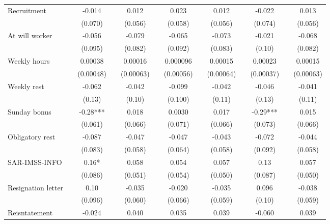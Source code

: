 \begin{tabular}{lcccccccccccc}
Recruitment &       & -0.014 &       & 0.012 &       & 0.023 &       & 0.012 &       & -0.022 &       & 0.013 \\
      &       & (0.070) &       & (0.056) &       & (0.058) &       & (0.056) &       & (0.074) &       & (0.056) \\
At will worker &       & -0.056 &       & -0.079 &       & -0.065 &       & -0.073 &       & -0.021 &       & -0.068 \\
      &       & (0.095) &       & (0.082) &       & (0.092) &       & (0.083) &       & (0.10) &       & (0.082) \\
Weekly hours &       & 0.00038 &       & 0.00016 &       & 0.000096 &       & 0.00015 &       & 0.00023 &       & 0.00015 \\
      &       & (0.00048) &       & (0.00063) &       & (0.00056) &       & (0.00064) &       & (0.00037) &       & (0.00063) \\
Weekly rest &       & -0.062 &       & -0.042 &       & -0.099 &       & -0.042 &       & -0.046 &       & -0.041 \\
      &       & (0.13) &       & (0.10) &       & (0.100) &       & (0.11) &       & (0.13) &       & (0.11) \\
Sunday bonus &       & -0.28*** &       & 0.018 &       & 0.0030 &       & 0.017 &       & -0.29*** &       & 0.015 \\
      &       & (0.061) &       & (0.066) &       & (0.071) &       & (0.066) &       & (0.073) &       & (0.066) \\
Obligatory rest &       & -0.087 &       & -0.047 &       & -0.047 &       & -0.043 &       & -0.072 &       & -0.044 \\
      &       & (0.083) &       & (0.058) &       & (0.064) &       & (0.058) &       & (0.092) &       & (0.058) \\
SAR-IMSS-INFO &       & 0.16* &       & 0.058 &       & 0.054 &       & 0.057 &       & 0.13  &       & 0.057 \\
      &       & (0.086) &       & (0.051) &       & (0.054) &       & (0.050) &       & (0.087) &       & (0.050) \\
Resignation letter &       & 0.10  &       & -0.035 &       & -0.020 &       & -0.035 &       & 0.096 &       & -0.038 \\
      &       & (0.096) &       & (0.060) &       & (0.066) &       & (0.059) &       & (0.10) &       & (0.059) \\
Reisntatement &       & -0.024 &       & 0.040 &       & 0.035 &       & 0.039 &       & -0.060 &       & 0.039 \\

\end{tabular}
